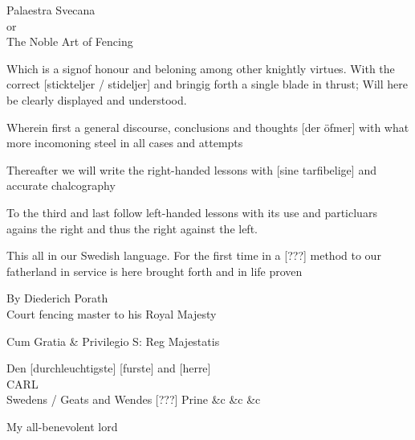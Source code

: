 \cleartoleftpage


\newpage

Palaestra Svecana \\
or \\
The Noble Art of Fencing

Which is a signof honour and beloning among other knightly virtues. With the correct [stickteljer / stideljer] and bringig forth a single blade in thrust; Will here be clearly displayed and understood.

Wherein first a general discourse, conclusions and thoughts [der öfmer] with what more incomoning steel in all cases and attempts

Thereafter we will write the right-handed lessons with [sine tarfibelige] and accurate chalcography

To the third and last follow left-handed lessons with its use and particluars agains the right and thus the right against the left.

This all in our Swedish language. For the first time in a [???] method to our fatherland in service is here brought forth and in life proven

By Diederich Porath \\
Court fencing master to his Royal Majesty

Cum Gratia \& Privilegio S: Reg Majestatis

\newpage 


\newpage

Den [durchleuchtigste] [furste] and [herre] \\
CARL \\
Swedens / Geats and Wendes [???] Prine \&c \&c \&c

My all-benevolent lord

\newpage